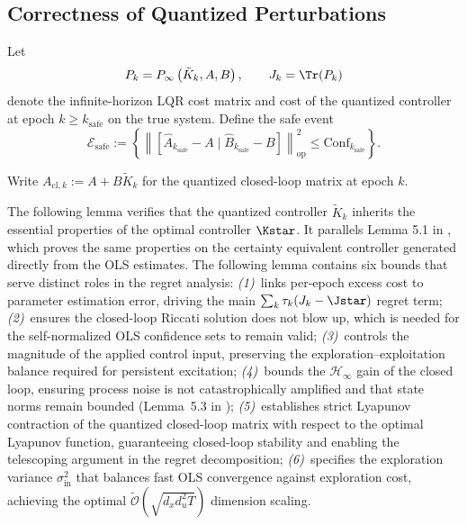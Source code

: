 \documentclass[11pt,journal,onecolumn]{IEEEtran}
\newcommand{\safe}{\mathrm{safe}}
\begin{document}
\subsection{Correctness of Quantized Perturbations}
\label{sec:quantized-perturbations}

Let
\begin{equation}\label{eq:Jk-def}
    P_k = P_\infty\left(\tilde K_k, A, B\right), \qquad J_k = \Tr(P_k)
\end{equation}
denote the infinite-horizon LQR cost matrix and cost of the quantized controller at epoch $k \geq k_{\safe}$ on the true system. Define the safe event
\begin{equation}\label{eq:Esafe}
    \mathcal{E}_{\text{safe}} := \left\{ \left\| \left[ \widehat{A}_{k_{\text{safe}}} - A \mid \widehat{B}_{k_{\text{safe}}} - B \right] \right\|_{\mathrm{op}}^2 \leq \text{Conf}_{k_{\text{safe}}} \right\}.
\end{equation}

Write $A_{\mathrm{cl},k} := A + B\tilde K_k$ for the quantized closed-loop matrix at epoch $k$.

The following lemma verifies that the quantized controller $\tilde K_k$ inherits the essential properties of the optimal controller $\Kstar$. It parallels Lemma 5.1 in \cite{simchowitz20a}, which proves the same properties on the certainty equivalent controller generated directly from the OLS estimates. The following lemma contains six bounds that serve distinct roles in the regret analysis:
\emph{(1)}~links per-epoch excess cost to parameter estimation error, driving the main $\sum_k \tau_k(J_k - \Jstar)$ regret term;
\emph{(2)}~ensures the closed-loop Riccati solution does not blow up, which is needed for the self-normalized OLS confidence sets to remain valid;
\emph{(3)}~controls the magnitude of the applied control input, preserving the exploration--exploitation balance required for persistent excitation;
\emph{(4)}~bounds the $\mathcal{H}_\infty$ gain of the closed loop, ensuring process noise is not catastrophically amplified and that state norms remain bounded (Lemma~5.3 in \cite{simchowitz20a});
\emph{(5)}~establishes strict Lyapunov contraction of the quantized closed-loop matrix with respect to the optimal Lyapunov function, guaranteeing closed-loop stability and enabling the telescoping argument in the regret decomposition;
\emph{(6)}~specifies the exploration variance $\sigma_{\mathrm{in}}^2$ that balances fast OLS convergence against exploration cost, achieving the optimal $\tilde{\mathcal{O}}(\sqrt{d_x d_u^2 T})$ dimension scaling.
\end{document}
